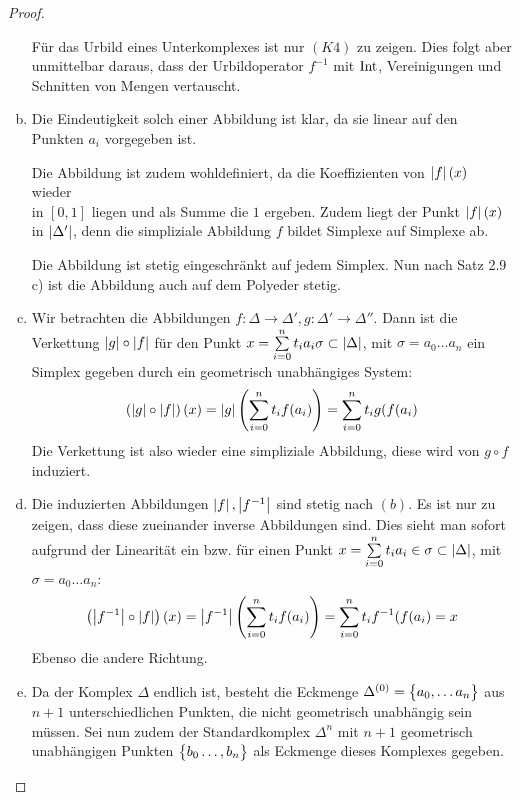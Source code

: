 \begin{Satz}
\begin{proof}
\begin{enumerate}[(a)]
            Für das Urbild eines Unterkomplexes ist nur $(K4)$ zu
            zeigen.  Dies folgt aber unmittelbar daraus, dass der
            Urbildoperator $f^{-1}$ mit $\operatorname{Int}$, Vereinigungen und
            Schnitten von Mengen vertauscht.
          \item Die Eindeutigkeit solch einer Abbildung ist klar, da
            sie linear auf den Punkten $a_i$ vorgegeben ist.

            Die Abbildung ist zudem wohldefiniert, da die
            Koeffizienten von $\left| f \right|(x)$ wieder \\in $[0,1]$ liegen
            und als Summe die $1$ ergeben. Zudem liegt der Punkt
            $\left| f \right|(x)$ in $\left| \Delta' \right|$, denn die simpliziale
            Abbildung $f$ bildet Simplexe auf Simplexe ab. 

            Die Abbildung ist stetig eingeschränkt auf jedem
            Simplex. Nun nach Satz 2.9 c) ist die Abbildung auch auf
            dem Polyeder stetig.

          \item Wir betrachten die Abbildungen
            $f : \Delta \rightarrow \Delta' , g : \Delta' \rightarrow
            \Delta''$.
            Dann ist die Verkettung $\left| g \right| \circ \left| f \right|$ für den
            Punkt $x = \sum\limits_{i=0}^{n} t_i a_i \sigma \subset \left| \Delta \right|$,
            mit $\sigma = a_0 \ldots a_n$ ein Simplex gegeben durch
            ein geometrisch unabhängiges System:
            \begin{gather*}
              \left( \left| g \right| \circ \left| f \right| \right) (x) = \left| g \right| \left(
                \sum\limits_{i=0}^{n} t_i f(a_i) \right) = \sum\limits_{i=0}^{n} t_i g(f(a_i)
            \end{gather*}
            Die Verkettung ist also wieder eine simpliziale Abbildung,
            diese wird von $g \circ f$ induziert.
          \item Die induzierten Abbildungen $\left| f \right|,\left| f^{-1} \right|$ sind
            stetig nach $(b)$. Es ist nur zu zeigen, dass diese
            zueinander inverse Abbildungen sind. Dies sieht man sofort
            aufgrund der Linearität ein bzw. für einen Punkt
            $x = \sum\limits_{i=0}^{n} t_i a_i \in \sigma \subset \left| \Delta \right|$, mit 
             $\sigma = a_0 \ldots a_n$:
            \begin{gather*}
              \left( \left| f^{-1} \right| \circ \left| f \right| \right) (x) =
              \left| f^{-1} \right| \left( \sum\limits_{i=0}^{n} t_i f(a_i) \right) =
              \sum\limits_{i=0}^{n} t_i f^{-1}(f(a_i) = x
            \end{gather*}
            Ebenso die andere Richtung.
          \item Da der Komplex $\Delta$ endlich ist, besteht die
            Eckmenge $\Delta^{(0)} = \bigl\{  a_0 , \ldots a_n \bigr\}$ aus
            $n+1$ unterschiedlichen Punkten, die nicht geometrisch
            unabhängig sein müssen. Sei nun zudem der Standardkomplex
            $\Delta^n$ mit $n+1$ geometrisch unabhängigen Punkten
            $\bigl\{ b_0 \ldots , b_n \bigr\}$ als Eckmenge dieses Komplexes
            gegeben.


\end{enumerate}
\end{proof}
\end{Satz}
